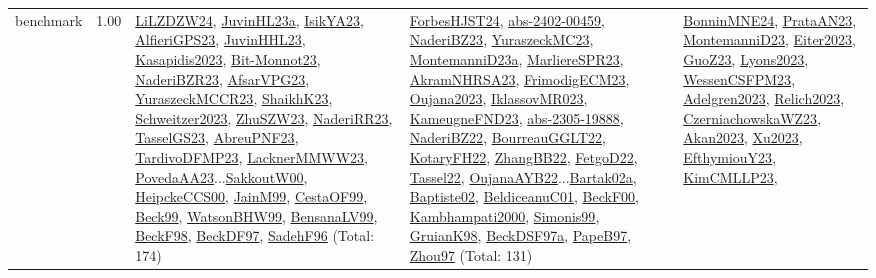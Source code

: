 {\begin{longtable}{p{3cm}r>{\raggedright\arraybackslash}p{6cm}>{\raggedright\arraybackslash}p{6cm}>{\raggedright\arraybackslash}p{8cm}}
\index{benchmark}\index{Benchmarks!benchmark}benchmark &  1.00 & \hyperref[detail:LiLZDZW24]{LiLZDZW24}, \hyperref[detail:JuvinHL23a]{JuvinHL23a}, \hyperref[detail:IsikYA23]{IsikYA23}, \hyperref[detail:AlfieriGPS23]{AlfieriGPS23}, \hyperref[detail:JuvinHHL23]{JuvinHHL23}, \hyperref[detail:Kasapidis2023]{Kasapidis2023}, \hyperref[detail:Bit-Monnot23]{Bit-Monnot23}, \hyperref[detail:NaderiBZR23]{NaderiBZR23}, \hyperref[detail:AfsarVPG23]{AfsarVPG23}, \hyperref[detail:YuraszeckMCCR23]{YuraszeckMCCR23}, \hyperref[detail:ShaikhK23]{ShaikhK23}, \hyperref[detail:Schweitzer2023]{Schweitzer2023}, \hyperref[detail:ZhuSZW23]{ZhuSZW23}, \hyperref[detail:NaderiRR23]{NaderiRR23}, \hyperref[detail:TasselGS23]{TasselGS23}, \hyperref[detail:AbreuPNF23]{AbreuPNF23}, \hyperref[detail:TardivoDFMP23]{TardivoDFMP23}, \hyperref[detail:LacknerMMWW23]{LacknerMMWW23}, \hyperref[detail:PovedaAA23]{PovedaAA23}...\hyperref[detail:SakkoutW00]{SakkoutW00}, \hyperref[detail:HeipckeCCS00]{HeipckeCCS00}, \hyperref[detail:JainM99]{JainM99}, \hyperref[detail:CestaOF99]{CestaOF99}, \hyperref[detail:Beck99]{Beck99}, \hyperref[detail:WatsonBHW99]{WatsonBHW99}, \hyperref[detail:BensanaLV99]{BensanaLV99}, \hyperref[detail:BeckF98]{BeckF98}, \hyperref[detail:BeckDF97]{BeckDF97}, \hyperref[detail:SadehF96]{SadehF96} (Total: 174) & \hyperref[detail:ForbesHJST24]{ForbesHJST24}, \hyperref[detail:abs-2402-00459]{abs-2402-00459}, \hyperref[detail:NaderiBZ23]{NaderiBZ23}, \hyperref[detail:YuraszeckMC23]{YuraszeckMC23}, \hyperref[detail:MontemanniD23a]{MontemanniD23a}, \hyperref[detail:MarliereSPR23]{MarliereSPR23}, \hyperref[detail:AkramNHRSA23]{AkramNHRSA23}, \hyperref[detail:FrimodigECM23]{FrimodigECM23}, \hyperref[detail:Oujana2023]{Oujana2023}, \hyperref[detail:IklassovMR023]{IklassovMR023}, \hyperref[detail:KameugneFND23]{KameugneFND23}, \hyperref[detail:abs-2305-19888]{abs-2305-19888}, \hyperref[detail:NaderiBZ22]{NaderiBZ22}, \hyperref[detail:BourreauGGLT22]{BourreauGGLT22}, \hyperref[detail:KotaryFH22]{KotaryFH22}, \hyperref[detail:ZhangBB22]{ZhangBB22}, \hyperref[detail:FetgoD22]{FetgoD22}, \hyperref[detail:Tassel22]{Tassel22}, \hyperref[detail:OujanaAYB22]{OujanaAYB22}...\hyperref[detail:Bartak02a]{Bartak02a}, \hyperref[detail:Baptiste02]{Baptiste02}, \hyperref[detail:BeldiceanuC01]{BeldiceanuC01}, \hyperref[detail:BeckF00]{BeckF00}, \hyperref[detail:Kambhampati2000]{Kambhampati2000}, \hyperref[detail:Simonis99]{Simonis99}, \hyperref[detail:GruianK98]{GruianK98}, \hyperref[detail:BeckDSF97a]{BeckDSF97a}, \hyperref[detail:PapeB97]{PapeB97}, \hyperref[detail:Zhou97]{Zhou97} (Total: 131) & \hyperref[detail:BonninMNE24]{BonninMNE24}, \hyperref[detail:PrataAN23]{PrataAN23}, \hyperref[detail:MontemanniD23]{MontemanniD23}, \hyperref[detail:Eiter2023]{Eiter2023}, \hyperref[detail:GuoZ23]{GuoZ23}, \hyperref[detail:Lyons2023]{Lyons2023}, \hyperref[detail:WessenCSFPM23]{WessenCSFPM23}, \hyperref[detail:Adelgren2023]{Adelgren2023}, \hyperref[detail:Relich2023]{Relich2023}, \hyperref[detail:CzerniachowskaWZ23]{CzerniachowskaWZ23}, \hyperref[detail:Akan2023]{Akan2023}, \hyperref[detail:Xu2023]{Xu2023}, \hyperref[detail:EfthymiouY23]{EfthymiouY23}, \hyperref[detail:KimCMLLP23]{KimCMLLP23}, 
\end{longtable}}
